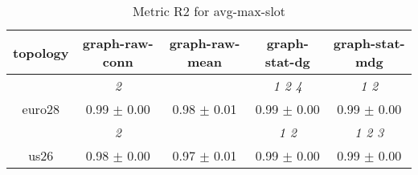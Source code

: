 \begin{table}[h]
\caption{Metric R2 for avg-max-slot}

        \centering
        \begin{tabular}{
        ccccc} \toprule 
 topology& graph-raw-conn & graph-raw-mean & graph-stat-dg & graph-stat-mdg \\ \toprule
 & \cellcolor[HTML]{EFEFEF} \textit{ 2 }& \cellcolor[HTML]{EFEFEF} & \cellcolor[HTML]{EFEFEF} \textit{ 1 2 4 }& \cellcolor[HTML]{EFEFEF} \textit{ 1 2 } \\ 
 {euro28}& \cellcolor[HTML]{EFEFEF} 0.99 $\pm$ 0.00& \cellcolor[HTML]{EFEFEF} 0.98 $\pm$ 0.01& \cellcolor[HTML]{EFEFEF} 0.99 $\pm$ 0.00& \cellcolor[HTML]{EFEFEF} 0.99 $\pm$ 0.00 \\ 
& \cellcolor[HTML]{EFEFEF} \textit{ 2 }& \cellcolor[HTML]{EFEFEF} & \cellcolor[HTML]{EFEFEF} \textit{ 1 2 }& \cellcolor[HTML]{EFEFEF} \textit{ 1 2 3 } \\ 
 {us26}& \cellcolor[HTML]{EFEFEF} 0.98 $\pm$ 0.00& \cellcolor[HTML]{EFEFEF} 0.97 $\pm$ 0.01& \cellcolor[HTML]{EFEFEF} 0.99 $\pm$ 0.00& \cellcolor[HTML]{EFEFEF} 0.99 $\pm$ 0.00 \\ 

        \bottomrule
        \end{tabular}%

        \end{table}
        
